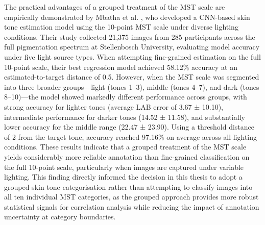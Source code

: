 The practical advantages of a grouped treatment of the MST scale are empirically demonstrated by Mbatha et al. \cite{Mbatha_2024_SkinToneLighting}, who developed a CNN-based skin tone estimation model using the 10-point MST scale under diverse lighting conditions. Their study collected 21,375 images from 285 participants across the full pigmentation spectrum at Stellenbosch University, evaluating model accuracy under five light source types. When attempting fine-grained estimation on the full 10-point scale, their best regression model achieved 58.12\% accuracy at an estimated-to-target distance of 0.5. However, when the MST scale was segmented into three broader groups—light (tones 1–3), middle (tones 4–7), and dark (tones 8–10)—the model showed markedly different performance across groups, with strong accuracy for lighter tones (average LAB error of 3.67 ± 10.10), intermediate performance for darker tones (14.52 ± 11.58), and substantially lower accuracy for the middle range (22.47 ± 23.90). Using a threshold distance of 2 from the target tone, accuracy reached 97.16\% on average across all lighting conditions. These results indicate that a grouped treatment of the MST scale yields considerably more reliable annotation than fine-grained classification on the full 10-point scale, particularly when images are captured under variable lighting. This finding directly informed the decision in this thesis to adopt a grouped skin tone categorisation rather than attempting to classify images into all ten individual MST categories, as the grouped approach provides more robust statistical signals for correlation analysis while reducing the impact of annotation uncertainty at category boundaries.

